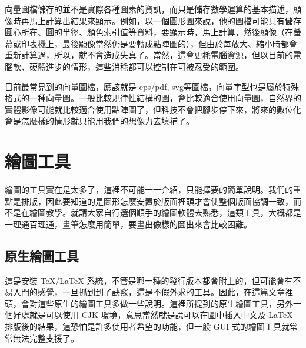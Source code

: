 向量圖檔儲存的並不是實際各種圖素的資訊，而只是儲存數學運算的基本描述，顯像時再馬上計算出結果來顯示。例如，以一個圓形圖來說，他的圖檔可能只有儲存圓心所在、圓的半徑、顏色索引值等資料，要顯示時，馬上計算，然後顯像（在螢幕或印表機上，最後顯像當然仍是要轉成點陣圖的），但由於每放大、縮小時都會重新計算過，所以，就不會造成失真了。當然，這會更秏電腦資源，但以目前的電腦軟、硬體進步的情形，這些消秏都可以控制在可被忍受的範圍。

目前最常見到的向量圖檔，應該就是 eps/pdf, svg\chdots{}等圖檔，向量字型也是屬於特殊格式的一種向量圖。一般比較規律性結構的圖，會比較適合使用向量圖，自然界的實體影像可能就比較適合使用點陣圖了，但科技不會把腳步停下來，將來的數位化會是怎麼樣的情形就只能用我們的想像力去填補了。

\section{繪圖工具}
\label{sec:graphictools}

繪圖的工具實在是太多了，這裡不可能一一介紹，只能擇要的簡單說明。我們的重點是排版，因此要知道的是圖形怎麼安置於版面裡頭才會使整個版面協調一致，而不是在繪圖教學。就請大家自行選個順手的繪圖軟體去熟悉，這類工具，大概都是一理通百理通，畫筆怎麼用簡單，要畫出像樣的圖出來會比較困難。

\subsection{原生繪圖工具}

這是安裝 \TeX{}/\LaTeX{} 系統，不管是哪一種的發行版本都會附上的，但可能會有不易入門的感覺，一旦抓到到了訣竅，這是不假外求的工具。因此，在這篇文章裡頭，會對這些原生的繪圖工具多做一些說明。這裡所提到的原生繪圖工具，另外一個好處就是可以使用 {\sffamily CJK} 環境，意思當然就是說可以在圖中插入中文及 \LaTeX{} 排版後的結果，這恐怕是許多使用者希望的功能，但一般 GUI 式的繪圖工具就常常無法完整支援了。

